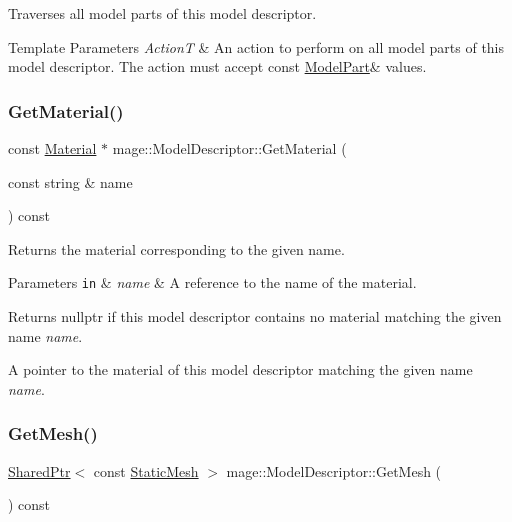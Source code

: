 Traverses all model parts of this model descriptor.


\begin{DoxyTemplParams}{Template Parameters}
{\em ActionT} & An action to perform on all model parts of this model descriptor. The action must accept {\ttfamily const} {\ttfamily \hyperlink{structmage_1_1_model_part}{Model\+Part}\&} values. \\
\hline
\end{DoxyTemplParams}
\hypertarget{classmage_1_1_model_descriptor_a689fa5039df71c630ec56db378214026}{}\label{classmage_1_1_model_descriptor_a689fa5039df71c630ec56db378214026} 
\subsubsection{\texorpdfstring{Get\+Material()}{GetMaterial()}}
{\footnotesize\ttfamily const \hyperlink{structmage_1_1_material}{Material} $\ast$ mage\+::\+Model\+Descriptor\+::\+Get\+Material (\begin{DoxyParamCaption}\item[{const string \&}]{name }\end{DoxyParamCaption}) const}

Returns the material corresponding to the given name.


\begin{DoxyParams}[1]{Parameters}
\mbox{\tt in}  & {\em name} & A reference to the name of the material. \\
\hline
\end{DoxyParams}
\begin{DoxyReturn}{Returns}
{\ttfamily nullptr} if this model descriptor contains no material matching the given name {\itshape name}. 

A pointer to the material of this model descriptor matching the given name {\itshape name}. 
\end{DoxyReturn}
\hypertarget{classmage_1_1_model_descriptor_a579724811ea4577c039cd1e7655c70fe}{}\label{classmage_1_1_model_descriptor_a579724811ea4577c039cd1e7655c70fe} 
\subsubsection{\texorpdfstring{Get\+Mesh()}{GetMesh()}}
{\footnotesize\ttfamily \hyperlink{namespacemage_a1e01ae66713838a7a67d30e44c67703e}{Shared\+Ptr}$<$ const \hyperlink{classmage_1_1_static_mesh}{Static\+Mesh} $>$ mage\+::\+Model\+Descriptor\+::\+Get\+Mesh (\begin{DoxyParamCaption}{ }\end{DoxyParamCaption}) const}

